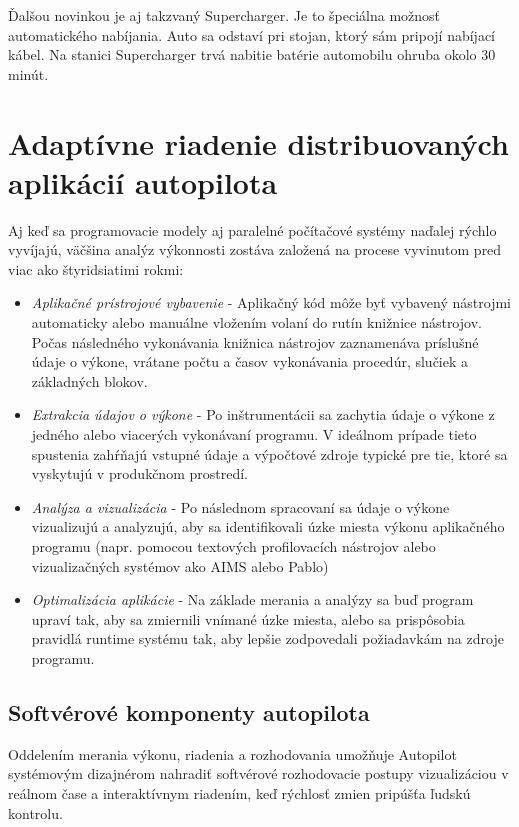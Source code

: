 \documentclass[10pt,twoside,slovak,a4paper]{article}
\begin{document}
Ďalšou novinkou je aj takzvaný Supercharger. Je to špeciálna možnosť automatického nabíjania. Auto sa odstaví pri stojan, ktorý sám pripojí nabíjací kábel. Na stanici Supercharger trvá nabitie batérie automobilu ohruba okolo 30 minút. \cite{TeslaAutopilot}

\section{Adaptívne riadenie distribuovaných aplikácií autopilota} \label{ARDAA}

Aj keď sa programovacie modely aj paralelné počítačové systémy naďalej rýchlo vyvíjajú, väčšina analýz výkonnosti zostáva založená na procese vyvinutom pred viac ako štyridsiatimi rokmi:

\begin{itemize}
\item \emph{Aplikačné prístrojové vybavenie} - Aplikačný kód môže byť vybavený nástrojmi automaticky alebo manuálne vložením volaní do rutín knižnice nástrojov. Počas následného vykonávania knižnica nástrojov zaznamenáva príslušné údaje o výkone, vrátane počtu a časov vykonávania procedúr, slučiek a základných blokov.
\item\emph{Extrakcia údajov o výkone} - Po inštrumentácii sa zachytia údaje o výkone z jedného alebo viacerých vykonávaní programu. V ideálnom prípade tieto spustenia zahŕňajú vstupné údaje a výpočtové zdroje typické pre tie, ktoré sa vyskytujú v produkčnom prostredí.
\item\emph{Analýza a vizualizácia} - Po následnom spracovaní sa údaje o výkone vizualizujú a analyzujú, aby sa identifikovali úzke miesta výkonu aplikačného programu (napr. pomocou textových profilovacích nástrojov alebo vizualizačných systémov ako AIMS  alebo Pablo)
\item\emph{Optimalizácia aplikácie} - Na základe merania a analýzy sa buď program upraví tak, aby sa zmiernili vnímané úzke miesta, alebo sa prispôsobia pravidlá runtime systému tak, aby lepšie zodpovedali požiadavkám na zdroje programu. \cite{SoftverAutopilot}
\end{itemize}

\subsection{Softvérové komponenty autopilota}

Oddelením merania výkonu, riadenia a rozhodovania umožňuje Autopilot systémovým dizajnérom nahradiť softvérové rozhodovacie postupy vizualizáciou v reálnom čase a interaktívnym riadením, keď rýchlosť zmien pripúšťa ľudskú kontrolu.
\end{document}
